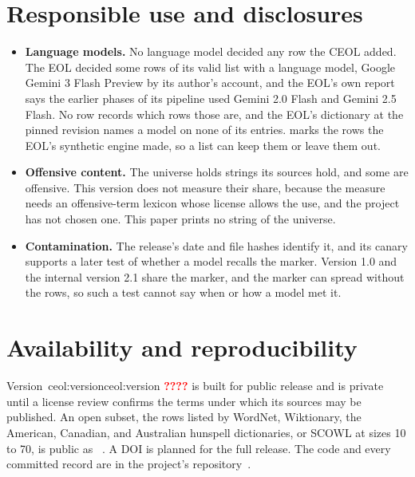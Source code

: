 \documentclass[11pt]{article}
\newcommand{\cv}[1]{\ifcsname ceol:#1\endcsname\csname ceol:#1\endcsname\else
  \textbf{\textcolor{red}{??\detokenize{#1}??}}\PackageWarning{ceol}{Undefined value \detokenize{#1}}\fi}
\begin{document}
\section{Responsible use and disclosures}

\begin{itemize}
\item \textbf{Language models.} No language model decided any row the CEOL added. The EOL decided
  some rows of its valid list with a language model, Google Gemini 3 Flash Preview by its author's
  account, and the EOL's own report says the earlier phases of its pipeline used Gemini 2.0 Flash and
  Gemini 2.5 Flash. No row records which rows those are, and the EOL's dictionary at the pinned
  revision names a model on none of its entries.  marks the rows the EOL's synthetic engine made, so a list can
  keep them or leave them out.
\item \textbf{Offensive content.} The universe holds strings its sources hold, and some are
  offensive. This version does not measure their share, because the measure needs an offensive-term
  lexicon whose license allows the use, and the project has not chosen one. This paper prints no
  string of the universe.
\item \textbf{Contamination.} The release's date and file hashes identify it, and its canary
  supports a later test of whether a model recalls the marker. Version 1.0 and the internal version
  2.1 share the marker, and the marker can spread without the rows, so such a test cannot say when or
  how a model met it.
\end{itemize}

\section{Availability and reproducibility}
\label{sec:availability}

Version~\cv{version} is built for public release and is private until a license review
confirms the terms under which its sources may be published. An open subset, the rows listed by
WordNet, Wiktionary, the American, Canadian, and Australian hunspell dictionaries, or SCOWL at sizes
10 to 70, is public as ~\cite{ceolopen2026}. A DOI is planned
for the full release. The code and every committed record are in the project's
repository~\cite{ceolrepo2026}.
\end{document}

